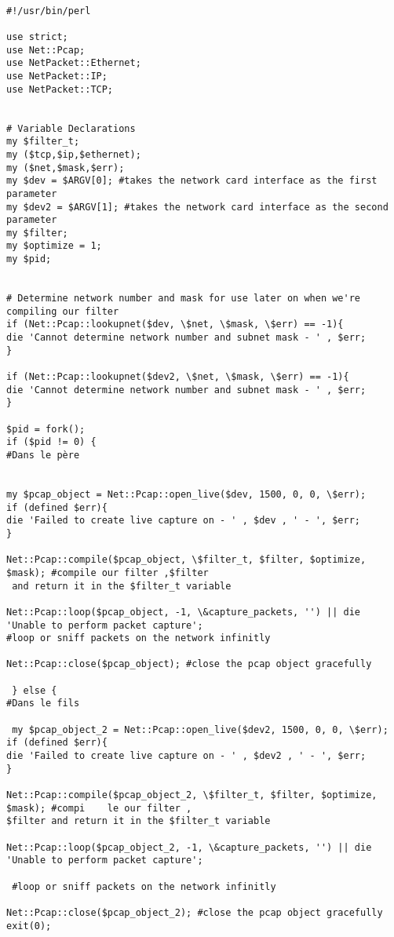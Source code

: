 \begin{verbatim}

#!/usr/bin/perl

use strict;
use Net::Pcap;
use NetPacket::Ethernet;
use NetPacket::IP;
use NetPacket::TCP;


# Variable Declarations
my $filter_t;
my ($tcp,$ip,$ethernet);
my ($net,$mask,$err);
my $dev = $ARGV[0]; #takes the network card interface as the first parameter
my $dev2 = $ARGV[1]; #takes the network card interface as the second parameter
my $filter;
my $optimize = 1;
my $pid;


# Determine network number and mask for use later on when we're compiling our filter
if (Net::Pcap::lookupnet($dev, \$net, \$mask, \$err) == -1){
die 'Cannot determine network number and subnet mask - ' , $err;
}

if (Net::Pcap::lookupnet($dev2, \$net, \$mask, \$err) == -1){
die 'Cannot determine network number and subnet mask - ' , $err;
}
 
$pid = fork();
if ($pid != 0) {
#Dans le père
 

my $pcap_object = Net::Pcap::open_live($dev, 1500, 0, 0, \$err);
if (defined $err){
die 'Failed to create live capture on - ' , $dev , ' - ', $err;
}

Net::Pcap::compile($pcap_object, \$filter_t, $filter, $optimize, $mask); #compile our filter ,$filter
 and return it in the $filter_t variable
 
Net::Pcap::loop($pcap_object, -1, \&capture_packets, '') || die 'Unable to perform packet capture'; 
#loop or sniff packets on the network infinitly

Net::Pcap::close($pcap_object); #close the pcap object gracefully
 
 } else {
#Dans le fils
 
 my $pcap_object_2 = Net::Pcap::open_live($dev2, 1500, 0, 0, \$err);
if (defined $err){
die 'Failed to create live capture on - ' , $dev2 , ' - ', $err;
}

Net::Pcap::compile($pcap_object_2, \$filter_t, $filter, $optimize, $mask); #compi    le our filter ,
$filter and return it in the $filter_t variable
 
Net::Pcap::loop($pcap_object_2, -1, \&capture_packets, '') || die 'Unable to perform packet capture';

 #loop or sniff packets on the network infinitly
 
Net::Pcap::close($pcap_object_2); #close the pcap object gracefully
exit(0);


\end{verbatim}
